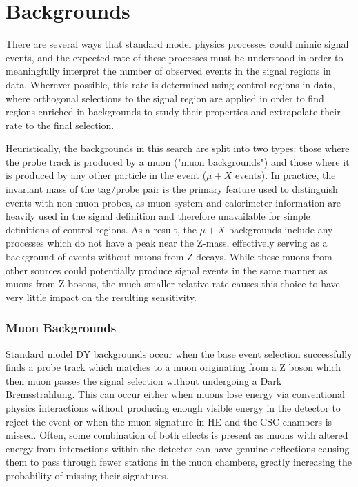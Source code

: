 \chapter{Backgrounds}
\label{backgrounds}
There are several ways that standard model physics processes could mimic signal events, and the expected rate of these processes must be understood in order to meaningfully interpret the number of observed events in the signal regions in data.
Wherever possible, this rate is determined using control regions in data, where orthogonal selections to the signal region are applied in order to find regions enriched in backgrounds to study their properties and extrapolate their rate to the final selection.

Heuristically, the backgrounds in this search are split into two types: those where the probe track is produced by a muon ("muon backgrounds") and those where it is produced by any other particle in the event ($\mu+X$ events).
In practice, the invariant mass of the tag/probe pair is the primary feature used to distinguish events with non-muon probes, as muon-system and calorimeter information are heavily used in the signal definition and therefore unavailable for simple definitions of control regions.
As a result, the $\mu+X$ backgrounds include any processes which do not have a peak near the Z-mass, effectively serving as a background of events without muons from Z decays.
While these muons from other sources could potentially produce signal events in the same manner as muons from Z bosons, the much smaller relative rate causes this choice to have very little impact on the resulting sensitivity.

\subsection{Muon Backgrounds}
Standard model DY backgrounds occur when the base event selection successfully finds a probe track which matches to a muon originating from a Z boson which then muon passes the signal selection without undergoing a Dark Bremsstrahlung. 
This can occur either when muons lose energy via conventional physics interactions without producing enough visible energy in the detector to reject the event or when the muon signature in HE and the CSC chambers is missed.
Often, some combination of both effects is present as muons with altered energy from interactions within the detector can have genuine deflections causing them to pass through fewer stations in the muon chambers, greatly increasing the probability of missing their signatures.

